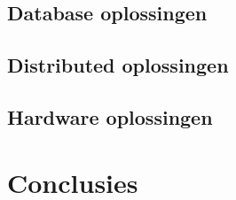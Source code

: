 \newpage

\subsection{Database oplossingen}
\label{sec:databases}

\clearpage

\subsection{Distributed oplossingen}
\label{sec:distributed}

\clearpage

\subsection{Hardware oplossingen}
\label{sec:hardware}

\clearpage

\section{Conclusies}
\label{sec:gevonden_tools}

